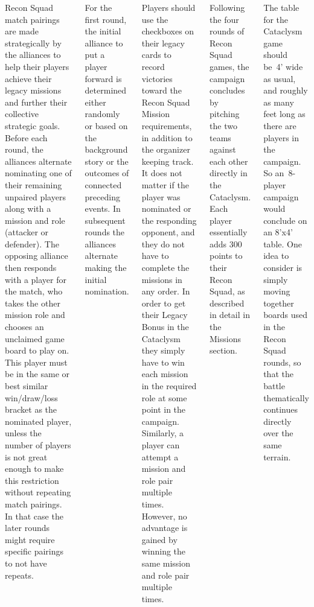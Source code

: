 \begin{columns}

Recon Squad match pairings are made strategically by the alliances to
help their players achieve their legacy missions and further their
collective strategic goals.  Before each round, the alliances
alternate nominating one of their remaining unpaired players along
with a mission and role (attacker or defender).  The opposing alliance
then responds with a player for the match, who takes the other mission
role and chooses an unclaimed game board to play on.  This player must
be in the same or best similar win/draw/loss bracket as the nominated
player, unless the number of players is not great enough to make this
restriction without repeating match pairings.  In that case the later
rounds might require specific pairings to not have repeats.

For the first round, the initial alliance to put a player forward is
determined either randomly or based on the background story or the
outcomes of connected preceding events.  In subsequent rounds the
alliances alternate making the initial nomination.

\columnbreak

Players should use the checkboxes on their legacy cards to record
victories toward the Recon Squad Mission requirements, in addition to
the organizer keeping track.  It does not matter if the player was
nominated or the responding opponent, and they do not have to complete
the missions in any order.  In order to get their Legacy Bonus in the
Cataclysm they simply have to win each mission in the required role at
some point in the campaign.  Similarly, a player can attempt a mission
and role pair multiple times.  However, no advantage is gained by
winning the same mission and role pair multiple times.


Following the four rounds of Recon Squad games, the campaign concludes
by pitching the two teams against each other directly in the
Cataclysm.  Each player essentially adds 300 points to their Recon
Squad, as described in detail in the Missions section.


  The table for the Cataclysm game should be~4'
wide as usual, and roughly as many feet long as there are players in
the campaign.  So an~8-player campaign would conclude on an 8'x4'
table.  One idea to consider is simply moving together boards used in
the Recon Squad rounds, so that the battle thematically continues
directly over the same terrain.


\end{columns}
